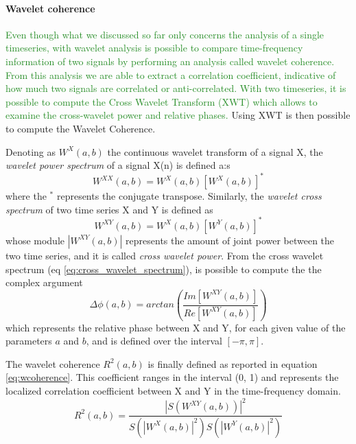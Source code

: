 \documentclass[11pt]{report}
\begin{document}
\paragraph{Wavelet coherence} \hfill \newline
\textcolor{ForestGreen}{
Even though what we discussed so far only concerns the analysis of a single timeseries, with wavelet analysis is possible to compare time-frequency information of two signals by performing an analysis called wavelet coherence.
From this analysis we are able to extract a correlation coefficient, indicative of how much two signals are correlated or anti-correlated.
With two timeseries, it is possible to compute the Cross Wavelet Transform (XWT) which allows to examine the cross-wavelet power and relative phases.
}
Using XWT is then possible to compute the Wavelet Coherence.

Denoting as $W^{X}(a, b)$ the continuous wavelet transform of a signal X, the \emph{wavelet power spectrum} of a signal X(n) is defined a:s
\begin{equation}
W^{XX}(a, b) = W^X(a, b) \left[W^X(a, b)\right]^{\ast}
\end{equation}
where the $^{\ast}$ represents the conjugate transpose.
Similarly, the \emph{wavelet cross spectrum} of two time series X and Y is defined as
\begin{equation}\label{eq:cross_wavelet_spectrum}
W^{XY}(a, b) = W^X(a, b)[W^Y(a, b)]^\ast
\end{equation}
whose module $|W^{XY}(a, b)|$ represents the amount of joint power between the two time series, and it is called \emph{cross wavelet power}.
From the cross wavelet spectrum (eq \ref{eq:cross_wavelet_spectrum}), is possible to compute the the complex argument
\begin{equation}\label{eq:wavelet_phase}
\Delta \phi (a, b) = arctan\left(\frac{Im\left[ W^{XY}(a, b)\right]}{Re\left[ W^{XY}(a, b)\right]} \right)
\end{equation}
which represents the relative phase between X and Y, for each given value of the parameters $a$ and $b$, and is defined over the interval $[-\pi, \pi]$.

The wavelet coherence $R^2(a, b)$ is finally defined as reported in equation \ref{eq:wcoherence}. This coefficient ranges in the interval (0, 1) and represents the localized correlation coefficient between X and Y in the time-frequency domain.
\begin{equation}\label{eq:wcoherence}
R^2(a, b) = \frac{|S(W^{XY}(a,b))|^2}{S(|W^X(a,b)|^2) S(|W^Y(a,b)|^2)}
\end{equation}
\end{document}
